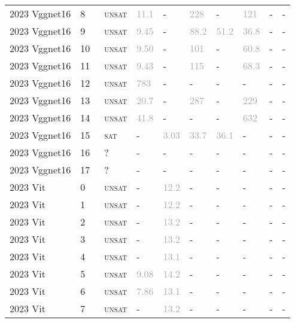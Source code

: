\begin{center}
{\begin{longtable}{@{}llllllllll@{}}
2023 Vggnet16 & 8 & ~\textsc{unsat} & \textcolor{darkgray}{11.1} & - & \textcolor{darkgray}{228} & - & \textcolor{darkgray}{121} & - & - \\
2023 Vggnet16 & 9 & ~\textsc{unsat} & \textcolor{darkgray}{9.45} & - & \textcolor{darkgray}{88.2} & \textcolor{darkgray}{51.2} & \textcolor{darkgray}{36.8} & - & - \\
2023 Vggnet16 & 10 & ~\textsc{unsat} & \textcolor{darkgray}{9.50} & - & \textcolor{darkgray}{101} & - & \textcolor{darkgray}{60.8} & - & - \\
2023 Vggnet16 & 11 & ~\textsc{unsat} & \textcolor{darkgray}{9.43} & - & \textcolor{darkgray}{115} & - & \textcolor{darkgray}{68.3} & - & - \\
2023 Vggnet16 & 12 & ~\textsc{unsat} & \textcolor{darkgray}{783} & - & - & - & - & - & - \\
2023 Vggnet16 & 13 & ~\textsc{unsat} & \textcolor{darkgray}{20.7} & - & \textcolor{darkgray}{287} & - & \textcolor{darkgray}{229} & - & - \\
2023 Vggnet16 & 14 & ~\textsc{unsat} & \textcolor{darkgray}{41.8} & - & - & - & \textcolor{darkgray}{632} & - & - \\
2023 Vggnet16 & 15 & ~\textsc{sat} & - & \textcolor{darkgray}{3.03} & \textcolor{darkgray}{33.7} & \textcolor{darkgray}{36.1} & - & - & - \\
2023 Vggnet16 & 16 & ~? & - & - & - & - & - & - & - \\
2023 Vggnet16 & 17 & ~? & - & - & - & - & - & - & - \\
\midrule
2023 Vit & 0 & ~\textsc{unsat} & - & \textcolor{darkgray}{12.2} & - & - & - & - & - \\
2023 Vit & 1 & ~\textsc{unsat} & - & \textcolor{darkgray}{12.2} & - & - & - & - & - \\
2023 Vit & 2 & ~\textsc{unsat} & - & \textcolor{darkgray}{13.2} & - & - & - & - & - \\
2023 Vit & 3 & ~\textsc{unsat} & - & \textcolor{darkgray}{13.2} & - & - & - & - & - \\
2023 Vit & 4 & ~\textsc{unsat} & - & \textcolor{darkgray}{13.1} & - & - & - & - & - \\
2023 Vit & 5 & ~\textsc{unsat} & \textcolor{darkgray}{9.08} & \textcolor{darkgray}{14.2} & - & - & - & - & - \\
2023 Vit & 6 & ~\textsc{unsat} & \textcolor{darkgray}{7.86} & \textcolor{darkgray}{13.1} & - & - & - & - & - \\
2023 Vit & 7 & ~\textsc{unsat} & - & \textcolor{darkgray}{13.2} & - & - & - & - & - \\

\end{longtable}}
\end{center}

